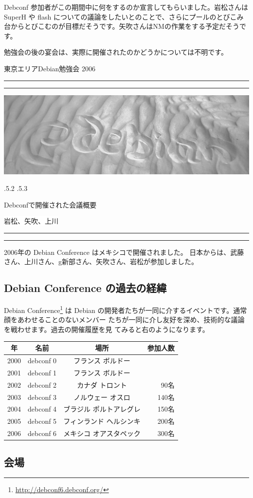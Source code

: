 \documentclass[mingoth,a4paper]{jsarticle}
\makeatletter
\renewcommand{\section}{\@startsection{section}{1}{\z@}%
    {\Cvs \@plus.5\Cdp \@minus.2\Cdp}%
    {.5\Cvs \@plus.3\Cdp}%
    {\normalfont\Huge\headfont\raggedright\centering}} %
\newcommand{\dancersection}[2]{%
\newpage
東京エリアDebian勉強会 2006
\hrule
\vspace{0.5mm}
\hrule
\hfill{}\includegraphics[width=16cm]{image2006-natsu/guruguru-sand-light.png}\\
\vspace{-5cm}
\begin{center}
\section{#1}
\end{center}
\hfill{}\colorbox{white}{#2}\hspace{3cm}\space\\
\vspace{1cm}
\hrule
\vspace{0.5mm}
\hrule
\vspace{1cm}
}
\makeatother
\begin{document}
Debconf 参加者がこの期間中に何をするのか宣言してもらいました。岩松さんは
SuperH や flash についての議論をしたいとのことで、さらにプールのとびこみ
台からとびこむのが目標だそうです。矢吹さんはNMの作業をする予定だそうです。
	  
勉強会の後の宴会は、実際に開催されたのかどうかについては不明です。

\dancersection{Debconfで開催された会議概要}{岩松、矢吹、上川}
\label{sec:debconf6}

2006年の Debian Conference はメキシコで開催されました。
日本からは、武藤さん、上川さん、g新部さん、矢吹さん、岩松が参加しました。
\subsection{Debian Conference の過去の経緯}

\begin{minipage}{0.5\hsize}
Debian Conference\footnote{\url{http://debconf6.debconf.org/}} は Debian 
の開発者たちが一同に介するイベントです。通常顔をあわせることのないメンバー
たちが一同に介し友好を深め、技術的な議論を戦わせます。過去の開催履歴を見
てみると右のようになります。
\end{minipage}
\begin{minipage}{0.5\hsize}
\begin{center}
{\footnotesize
 \begin{tabular}{|c|c|c|r|}
 \hline
 年 & 名前 & 場所 & 参加人数 \\
 \hline
 2000 & debconf 0 &フランス ボルドー & \\
 2001 & debconf 1 &フランス ボルドー & \\
 2002 & debconf 2 &カナダ トロント & 90名 \\
 2003 & debconf 3 &ノルウェー オスロ & 140名 \\
 2004 & debconf 4 &ブラジル ポルトアレグレ &  150名 \\
 2005 & debconf 5 &フィンランド ヘルシンキ & 200名 \\
 2006 & debconf 6 &メキシコ オアスタペック & 300名 \\
 \hline
 \end{tabular}
}
\end{center}
\end{minipage}


\subsection{会場}
\end{document}
